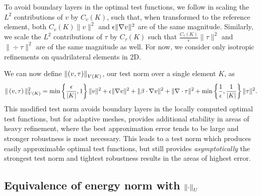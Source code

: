 To avoid boundary layers in the optimal test functions, we follow \cite{DPGrobustness} in scaling the $L^2$ contributions of $v$ by $C_v(K)$, such that, when transformed to the reference element, both $C_v(K)\|v\|^2$ and $\epsilon\|\grad v\|^2$ are of the same magnitude. Similarly, we scale the $L^2$ contributions of $\tau$ by $C_\tau(K)$ such that $\frac{C_\tau(K)}{\epsilon} \|\tau\|^2$ and $\|\div \tau\|^2$ are of the same magnitude as well. For now, we consider only isotropic refinements on quadrilateral elements in 2D.

We can now define $\nor{\LRp{v,\tau}}_{V(K)}$, our test norm over a single element $K$, as 
\[
\|\left(v,\tau\right)\|_{V(K)}^2 = \min\left\{\frac{\epsilon}{|K|},1\right\}\|v\|^2 + \epsilon \|\grad v\|^2 + \|\beta \cdot \grad v\|^2 + \| \div \tau\|^2 + \min\left\{\frac{1}{\epsilon},\frac{1}{|K|}\right\}\|\tau\|^2.
\]
This modified test norm avoids boundary layers in the locally computed optimal test functions, but for adaptive meshes, provides additional stability in areas of heavy refinement, where the best approximation error tends to be large and stronger robustness is most necessary.  This leads to a test norm which produces easily approximable optimal test functions, but still provides \textit{asymptotically} the strongest test norm and tightest robustness results in the areas of highest error. 

\subsection{Equivalence of energy norm with $\nor{\cdot}_U$}
\label{sec:main_bounds}

